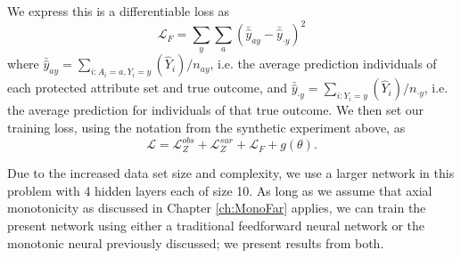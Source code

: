         We express this is a differentiable loss as 
        $$
            \mathcal{L}_F = \sum\limits_{y} \sum\limits_{a} \left( \bar{\hat{y}}_{ay} - \bar{\hat{y}}_{\cdot y} \right)^2
        $$
        where $\bar{\hat{y}}_{ay} = \sum_{i: A_i = a, Y_i = y}(\hat{Y}_i) / n_{ay}$, i.e. the average prediction individuals of each protected attribute set and true outcome, and $\bar{\hat{y}}_{\cdot y} = \sum_{i: Y_i = y}(\hat{Y}_i) / n_{\cdot y}$, i.e. the average prediction for individuals of that true outcome.  We then set our training loss, using the notation from the synthetic experiment above, as
            $$\mathcal{L} = \mathcal{L}_Z^{obs}
                          + \mathcal{L}_Z^{sur}
                          + \mathcal{L}_F
                          + g(\theta).$$
        
        Due to the increased data set size and complexity, we use a larger network in this problem with 4 hidden layers each of size 10.  As long as we assume that axial monotonicity as discussed in Chapter \ref{ch:MonoFar} applies, we can train the present network using either a traditional feedforward neural network or the monotonic neural previously discussed; we present results from both.
        
        
